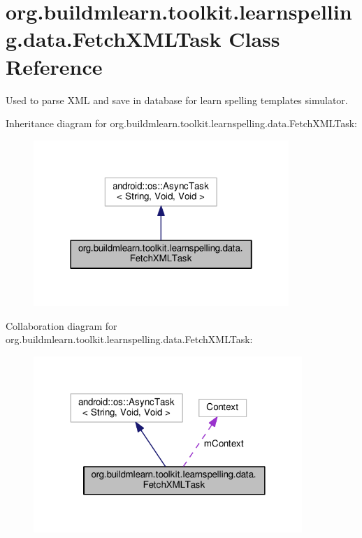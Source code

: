 \hypertarget{classorg_1_1buildmlearn_1_1toolkit_1_1learnspelling_1_1data_1_1FetchXMLTask}{}\section{org.\+buildmlearn.\+toolkit.\+learnspelling.\+data.\+Fetch\+X\+M\+L\+Task Class Reference}
\label{classorg_1_1buildmlearn_1_1toolkit_1_1learnspelling_1_1data_1_1FetchXMLTask}


Used to parse X\+ML and save in database for learn spelling template\textquotesingle{}s simulator.  




Inheritance diagram for org.\+buildmlearn.\+toolkit.\+learnspelling.\+data.\+Fetch\+X\+M\+L\+Task\+:
\nopagebreak
\begin{figure}[H]
\begin{center}
\leavevmode
\includegraphics[width=274pt]{classorg_1_1buildmlearn_1_1toolkit_1_1learnspelling_1_1data_1_1FetchXMLTask__inherit__graph}
\end{center}
\end{figure}


Collaboration diagram for org.\+buildmlearn.\+toolkit.\+learnspelling.\+data.\+Fetch\+X\+M\+L\+Task\+:
\nopagebreak
\begin{figure}[H]
\begin{center}
\leavevmode
\includegraphics[width=288pt]{classorg_1_1buildmlearn_1_1toolkit_1_1learnspelling_1_1data_1_1FetchXMLTask__coll__graph}
\end{center}
\end{figure}
